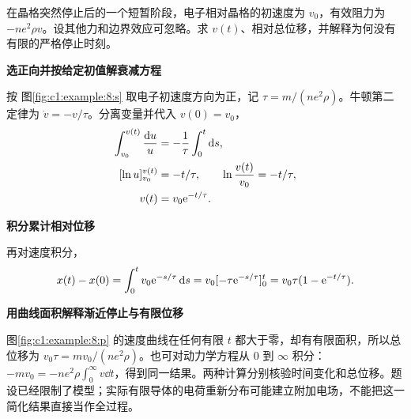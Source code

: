 \begin{question}\begin{example}[金属棒突然停止后的简化漂移]\label{c1:example:8}
在晶格突然停止后的一个短暂阶段，电子相对晶格的初速度为 $v_0$，有效阻力为 $-ne^2\rho v$。设其他力和边界效应可忽略。求 $v(t)$、相对总位移，并解释为何没有有限的严格停止时刻。
\end{example}
\end{question}
\begin{solution}\textbf{选正向并按给定初值解衰减方程}\par\nobreak
按 图\ref{fig:c1:example:8:s} 取电子初速度方向为正，记 $\tau=m/(ne^2\rho)$。牛顿第二定律为 $\dot v=-v/\tau$。分离变量并代入 $v(0)=v_0$，
\[
 \begin{aligned}
 \int_{v_0}^{v(t)}\frac{\mathop{}\!\mathrm d u}{u}
 &=-\frac1\tau\int_0^t\mathop{}\!\mathrm d s,\\
 [\ln u]_{v_0}^{v(t)}&=-t/\tau,\qquad
 \ln\frac{v(t)}{v_0}=-t/\tau,\\
 v(t)&=v_0\mathrm e^{-t/\tau}.
\end{aligned}
\]


\par\medskip{}\noindent\textbf{积分累计相对位移}\par\nobreak
再对速度积分，
\[
 x(t)-x(0)=\int_0^t v_0\mathrm e^{-s/\tau}\mathop{}\!\mathrm d s
 =v_0[-\tau\mathrm e^{-s/\tau}]_0^t
=v_0\tau(1-\mathrm e^{-t/\tau}).
\]



\par\medskip{}\noindent\textbf{用曲线面积解释渐近停止与有限位移}\par\nobreak
图\ref{fig:c1:example:8:p} 的速度曲线在任何有限 $t$ 都大于零，却有有限面积，所以总位移为 $v_0\tau=mv_0/(ne^2\rho)$。也可对动力学方程从 $0$ 到 $\infty$ 积分：$-mv_0=-ne^2\rho\int_0^\infty v\dd t$，得到同一结果。两种计算分别核验时间变化和总位移。题设已经限制了模型；实际有限导体的电荷重新分布可能建立附加电场，不能把这一简化结果直接当作全过程。\end{solution}
